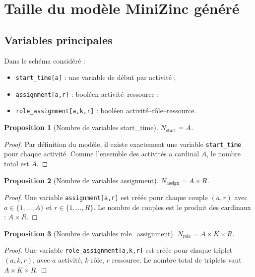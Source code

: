 \documentclass[12pt,a4paper]{article}
\newtheorem{proposition}{Proposition}[section]
\begin{document}
\section{Taille du modèle MiniZinc généré}

\subsection{Variables principales}
Dans le schéma considéré :
\begin{itemize}
  \item \texttt{start\_time[a]} : une variable de début par activité ;
  \item \texttt{assignment[a,r]} : booléen activité--ressource ;
  \item \texttt{role\_assignment[a,k,r]} : booléen activité--rôle--ressource.
\end{itemize}

\begin{proposition}[Nombre de variables start\_time]
$N_{\text{start}} = A$.
\end{proposition}
\begin{proof}
Par définition du modèle, il existe exactement une variable \texttt{start\_time} pour chaque activité. Comme l'ensemble des activités a cardinal $A$, le nombre total est $A$.
\end{proof}

\begin{proposition}[Nombre de variables assignment]
$N_{\text{assign}} = A\times R$.
\end{proposition}
\begin{proof}
Une variable \texttt{assignment[a,r]} est créée pour chaque couple $(a,r)$ avec $a\in\{1,\dots,A\}$ et $r\in\{1,\dots,R\}$. Le nombre de couples est le produit des cardinaux : $A\times R$.
\end{proof}

\begin{proposition}[Nombre de variables role\_assignment]
$N_{\text{role}} = A\times K\times R$.
\end{proposition}
\begin{proof}
Une variable \texttt{role\_assignment[a,k,r]} est créée pour chaque triplet $(a,k,r)$, avec $a$ activité, $k$ rôle, $r$ ressource. Le nombre total de triplets vaut $A\times K\times R$.
\end{proof}
\end{document}
